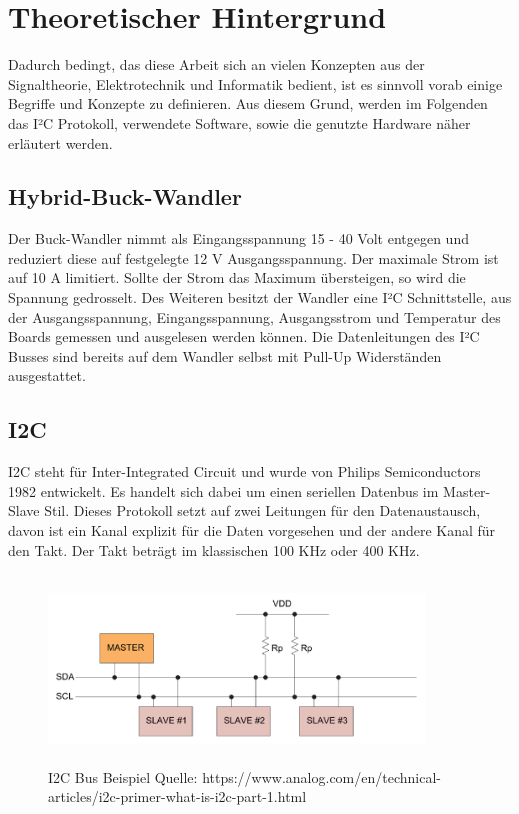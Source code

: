 \section{Theoretischer Hintergrund}
Dadurch bedingt, das diese Arbeit sich an vielen Konzepten aus der Signaltheorie, Elektrotechnik und Informatik bedient, ist es sinnvoll vorab einige Begriffe und Konzepte zu definieren. Aus diesem Grund, werden im Folgenden das I²C Protokoll, verwendete Software, sowie die genutzte Hardware näher erläutert werden. 

\subsection{Hybrid-Buck-Wandler}
Der Buck-Wandler nimmt als Eingangsspannung 15 - 40 Volt entgegen und reduziert diese auf festgelegte 12 V Ausgangsspannung. Der maximale Strom ist auf 10 A limitiert. Sollte der Strom das Maximum übersteigen, so wird die Spannung gedrosselt. Des Weiteren besitzt der Wandler eine I²C Schnittstelle, aus der Ausgangsspannung, Eingangsspannung, Ausgangsstrom und Temperatur des Boards gemessen und ausgelesen werden können. Die Datenleitungen des I²C Busses sind bereits auf dem Wandler selbst mit Pull-Up Widerständen ausgestattet. 

\subsection{I2C}
I2C steht für Inter-Integrated Circuit und wurde von Philips Semiconductors 1982 entwickelt. Es handelt sich dabei um einen seriellen Datenbus im Master-Slave Stil. Dieses Protokoll setzt auf zwei Leitungen für den Datenaustausch, davon ist ein Kanal explizit für die Daten vorgesehen und der andere Kanal für den Takt. Der Takt beträgt im klassischen 100 KHz oder 400 KHz. 

\begin{figure}
    \centering
    \includegraphics[height= 5cm, width = 10cm]{Pictures/I2C_Bus.png}
    \caption{I2C Bus Beispiel Quelle: https://www.analog.com/en/technical-articles/i2c-primer-what-is-i2c-part-1.html}
\end{figure}


